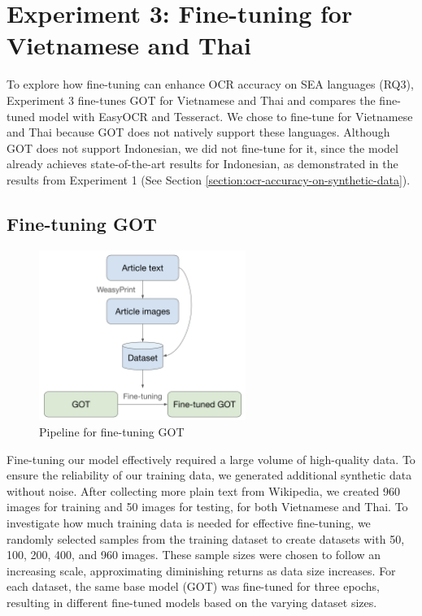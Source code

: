\documentclass[12pt,oneside]{memoir}
\begin{document}
\section{Experiment 3: Fine-tuning for Vietnamese and Thai} \label{section:experiment-3}

To explore how fine-tuning can enhance OCR accuracy on SEA languages (RQ3), Experiment 3 fine-tunes GOT for Vietnamese and Thai and compares the fine-tuned model with EasyOCR and Tesseract. 
We chose to fine-tune for Vietnamese and Thai because GOT does not natively support these languages. 
Although GOT does not support Indonesian, we did not fine-tune for it, since the model already achieves state-of-the-art results for Indonesian, as demonstrated in the results from Experiment 1 (See Section \ref{section:ocr-accuracy-on-synthetic-data}). 

\subsection{Fine-tuning GOT}

\begin{figure}[ht]
    \centering
    \includegraphics[width=0.6\textwidth]{images/fine-tuning.png}
    \caption{Pipeline for fine-tuning GOT}
    \label{figure:fine-tuning}
\end{figure}

Fine-tuning our model effectively required a large volume of high-quality data. 
To ensure the reliability of our training data, we generated additional synthetic data without noise. 
After collecting more plain text from Wikipedia, we created 960 images for training and 50 images for testing, for both Vietnamese and Thai.
To investigate how much training data is needed for effective fine-tuning, we randomly selected samples from the training dataset to create datasets with 50, 100, 200, 400, and 960 images. 
These sample sizes were chosen to follow an increasing scale, approximating diminishing returns as data size increases.
For each dataset, the same base model (GOT) was fine-tuned for three epochs, resulting in different fine-tuned models based on the varying dataset sizes.
\end{document}
